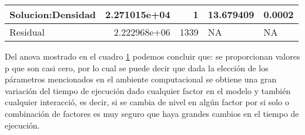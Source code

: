 \documentclass[12pt]{article}
\begin{document}
\begin{table}[H]
{\begin{tabular}{|l|r|r|r|r|}
Solucion:Densidad                     & 2.271015e+04                                                                               & 1                                                                                           & 13.679409                                                                            & 0.0002                                           \\ \hline
Residual                              & 2.222968e+06                                                                               & 1339                                                                                        & \multicolumn{1}{l|}{NA}                                                              & \multicolumn{1}{l|}{NA}                          \\ \hline
\end{tabular}}
\label{cua1}
\end{table}

Del anova mostrado en el cuadro \ref{cua1} podemos concluir que: se proporcionan valores p que son casi cero, por lo cual se puede decir que dada la elección de los párametros mencionados en el ambiente computacional se obtiene una gran variación del tiempo de ejecución dado cualquier factor en el modelo y también cualquier interacció, es decir, si se cambia de nivel en algún  factor por si solo o combinación de factores es muy seguro que haya grandes cambios en el tiempo de ejecución. 

\newpage


\end{document}
